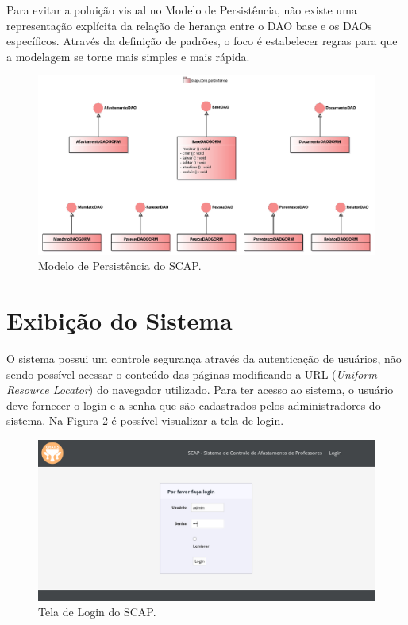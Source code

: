 Para evitar a poluição visual no Modelo de Persistência, não existe uma representação explícita da relação de herança entre o DAO base e os DAOs específicos. Através da definição de padrões, o foco é estabelecer regras para que a modelagem se torne mais simples e mais rápida.    

\begin{figure}[h]
	\centering
	\includegraphics[scale=0.4]{figuras/fig-projeto-persistencia} 
	\caption{Modelo de Persistência do SCAP.}
	\label{fig-projeto-persistencia}
\end{figure}

\section{Exibição do Sistema}
\label{sec-projeto-exibicao-sistema}

O sistema possui um controle segurança através da autenticação de usuários, não sendo possível acessar o conteúdo das páginas modificando a URL (\textit{Uniform Resource Locator}) do navegador utilizado. Para ter acesso ao sistema, o usuário deve fornecer o login e a senha que são cadastrados pelos administradores do sistema. Na Figura \ref{fig-projeto-login} é possível visualizar a tela de login.   

\begin{figure}[h]
	\centering
	\includegraphics[scale=0.33]{figuras/fig-projeto-login} 
	\caption{Tela de Login do SCAP.}
	\label{fig-projeto-login}
\end{figure}

